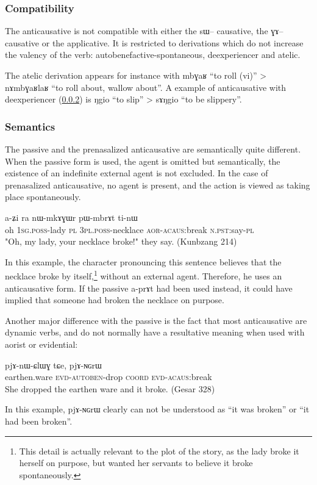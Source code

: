 \documentclass[oldfontcommands,oneside,a4paper,11pt]{memoir}
\newcommand{\ipa}[1]{{\phon #1}} %
\newcommand{\acaus}{\textsc{acaus}}
\newcommand{\aor}{\textsc{aor}}
\newcommand{\auto}{\textsc{autoben}}
\newcommand{\coord}{\textsc{coord}}
\newcommand{\evd}{\textsc{evd}}
\newcommand{\npst}{\textsc{n.pst}}
\newcommand{\pl}{\textsc{pl}}
\newcommand{\poss}{\textsc{poss}}
\newcommand{\sg}{\textsc{sg}}
\begin{document}
\subsubsection{Compatibility}
 The anticausative is not compatible with either the  \ipa{sɯ}-- causative, the \ipa{ɣɤ}-- causative or the applicative. It is restricted to derivations which do not increase the valency of the verb: autobenefactive-spontaneous, deexperiencer and atelic.

The atelic derivation appears for instance with \ipa{mbɣaʁ} ``to roll (vi)'' > \ipa{nɤmbɣaʁlaʁ} ``to roll about, wallow about''. A example of anticausative with deexperiencer (\ref{subsub:anticaus.semantics}) is \ipa{ŋgio} ``to slip'' > \ipa{sɤŋgio} ``to be slippery''.
 
\subsubsection{Semantics}  \label{subsub:anticaus.semantics}


The  passive and the prenasalized anticausative are semantically quite different.  When the  passive form is used,  the agent is omitted  but semantically, the existence of an indefinite external agent is not excluded. In the case of prenasalized anticausative, no agent is present, and the action is viewed as taking place spontaneously. 

 \begin{exe}
\ex
\gll  \ipa{wo} 	\ipa{a-ʑi} 	\ipa{ra} 	\ipa{nɯ-mkɤɣɯr} 	\ipa{pɯ-mbrɤt} 	\ipa{ti-nɯ}   \\
      oh 1\sg{}.\poss{}-lady \pl{} 3\pl{}.\poss{}-necklace  \aor{}-\acaus{}:break \npst{}:say-\pl{}\\
 \glt  "Oh, my lady, your necklace broke!" they say.  (Kunbzang 214)
\end{exe} 
In this example, the character pronouncing this sentence believes that the necklace broke by itself,\footnote{This detail is actually relevant to the plot of the story, as the lady broke it herself on purpose, but wanted her servants to believe it broke spontaneously.} without an external agent. Therefore, he uses an anticausative form. If the passive \ipa{a-prɤt} had been used instead, it could have implied that someone had broken the necklace on purpose.

Another major difference with the passive is the fact that most anticausative are dynamic verbs, and do not normally have a resultative meaning when used with aorist or evidential:
\begin{exe}
\ex
\gll  \ipa{popo} 	\ipa{pjɤ-nɯ-ɕlɯɣ} 	\ipa{tɕe,} 	\ipa{pjɤ-ɴɢrɯ}    \\
       earthen.ware \evd{}-\auto{}-drop \coord{} \evd{}-\acaus{}:break \\
 \glt  She dropped the earthen ware and it broke. (Gesar 328)
\end{exe} 
In this example, \ipa{pjɤ-ɴɢrɯ} clearly can  not be understood as ``it was broken'' or ``it had been broken''.
\end{document}
